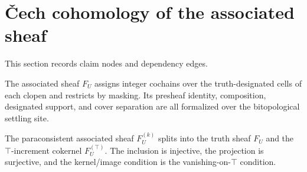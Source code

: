 \section{\v{C}ech cohomology of the associated sheaf}

This section records claim nodes and dependency edges.

\begin{theorem}\label{thm:settling-associated-sheaf}\leanok{}
The associated sheaf \(F_U\) assigns integer cochains over the truth-designated
cells of each clopen and restricts by masking.  Its presheaf identity,
composition, designated support, and cover separation are all formalized over
the bitopological settling site.
\end{theorem}

\begin{theorem}\label{thm:designated-short-exact-sequence}\leanok{}
The paraconsistent associated sheaf \(F_U^{(k)}\) splits into the truth sheaf
\(F_U\) and the \(\top\)-increment cokernel \(F_U^{(\top)}\).  The inclusion is
injective, the projection is surjective, and the kernel/image condition is the
vanishing-on-\(\top\) condition.
\end{theorem}

